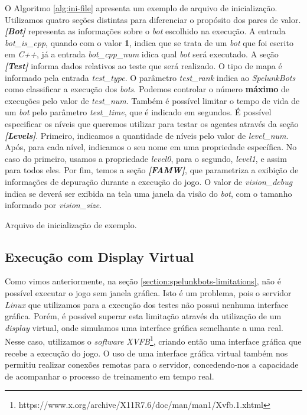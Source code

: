 O Algoritmo \ref{alg:ini-file} apresenta um exemplo de arquivo de inicialização.
Utilizamos quatro seções distintas para diferenciar o propósito dos pares de
valor. \textit{\textbf{[Bot]}} representa as informações sobre o \textit{bot}
escolhido na execução. A entrada \textit{bot\_is\_cpp}, quando com o valor
\textbf{1}, indica que se trata de um \textit{bot} que foi escrito em
\textit{C++}, já a entrada \textit{bot\_cpp\_num} idica qual \textit{bot} será
executado.  A seção \textit{\textbf{[Test]}} informa dados relativos ao teste
que será realizado. O tipo de mapa é informado pela entrada \textit{test\_type}.
O parâmetro \textit{test\_rank} indica ao \textit{SpelunkBots} como classificar
a execução dos \textit{bots}. Podemos controlar o número \textbf{máximo} de
execuções pelo valor de \textit{test\_num}. Também é possível limitar o tempo de
vida de um \textit{bot} pelo parâmetro \textit{test\_time}, que é indicado em
segundos.  É possível especificar os níveis que queremos utilizar para testar os
agentes através da seção \textit{\textbf{[Levels]}}. Primeiro, indicamos a
quantidade de níveis pelo valor de \textit{level\_num}. Após, para cada nível,
indicamos o seu nome em uma propriedade específica. No caso do primeiro, usamos
a propriedade \textit{level0}, para o segundo, \textit{level1}, e assim para
todos eles.  Por fim, temos a seção \textit{\textbf{[FAMW]}}, que parametriza a
exibição de informações de depuração durante a execução do jogo.  O valor de
\textit{vision\_debug} indica se deverá ser exibida na tela uma janela da visão
do \textit{bot}, com o tamanho informado por \textit{vision\_size}.

\begin{algorithm}[H]

	\caption[Exemplo de um arquivo de inicialização \textit{.INI}.]
{\label{alg:ini-file}Arquivo de inicialização de exemplo.}
\end{algorithm}

\subsection{\label{sub:virtual-display}Execução com Display Virtual}

Como vimos anteriormente, na seção \ref{section:spelunkbots-limitations}, não é
possível executar o jogo sem janela gráfica. Isto é um problema, pois o servidor
\textit{Linux} que utilizamos para a execução dos testes não possui nenhuma
interface gráfica.  Porém, é possível superar esta limitação através da
utilização de um \textit{display} virtual, onde simulamos uma interface gráfica
semelhante a uma real. Nesse caso, utilizamos o \textit{software}
\textit{XVFB}\footnote{https://www.x.org/archive/X11R7.6/doc/man/man1/Xvfb.1.xhtml},
criando então uma interface gráfica que recebe a execução do jogo. O uso de uma
interface gráfica virtual também nos permitiu realizar conexões remotas para o
servidor, concedendo-nos a capacidade de acompanhar o processo de treinamento em
tempo real.

